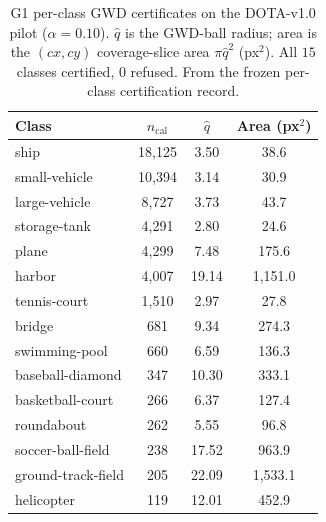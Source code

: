 \documentclass[journal]{IEEEtran}
\begin{document}
\begin{table}[!t]\centering\small
\caption{G1 per-class GWD certificates on the DOTA-v1.0 pilot ($\alpha=0.10$). $\hat q$ is the GWD-ball
radius; area is the $(cx,cy)$ coverage-slice area $\pi\hat q^2$ (px$^2$). All $15$ classes certified, $0$
refused. From the frozen per-class certification record.}\label{tab:g1mondrian}
\begin{tabular}{lccc}
\toprule
Class & $n_{\mathrm{cal}}$ & $\hat q$ & Area (px$^2$) \\
\midrule
ship               & 18{,}125 & 3.50 & 38.6 \\
small-vehicle      & 10{,}394 & 3.14 & 30.9 \\
large-vehicle      & 8{,}727  & 3.73 & 43.7 \\
storage-tank       & 4{,}291  & 2.80 & 24.6 \\
plane              & 4{,}299  & 7.48 & 175.6 \\
harbor             & 4{,}007  & 19.14 & 1{,}151.0 \\
tennis-court       & 1{,}510  & 2.97 & 27.8 \\
bridge             & 681      & 9.34 & 274.3 \\
swimming-pool      & 660      & 6.59 & 136.3 \\
baseball-diamond   & 347      & 10.30 & 333.1 \\
basketball-court   & 266      & 6.37 & 127.4 \\
roundabout         & 262      & 5.55 & 96.8 \\
soccer-ball-field  & 238      & 17.52 & 963.9 \\
ground-track-field & 205      & 22.09 & 1{,}533.1 \\
helicopter         & 119      & 12.01 & 452.9 \\
\bottomrule
\end{tabular}
\end{table}
\end{document}
